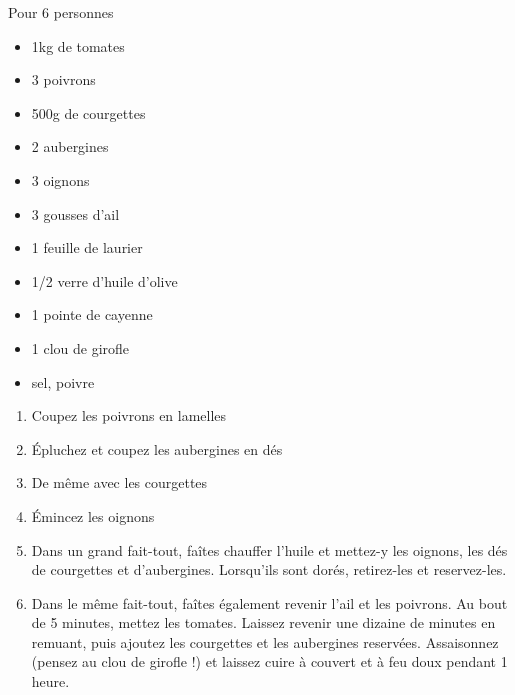 \bigskip
{}
{Pour 6 personnes}{\begin{itemize}
	\item 1kg de tomates
	\item 3 poivrons
	\item 500g de courgettes
	\item 2 aubergines
	\item 3 oignons
	\item 3 gousses d'ail
	\item 1 feuille de laurier
	\item 1/2 verre d'huile d'olive
	\item 1 pointe de cayenne
	\item 1 clou de girofle
	\item sel, poivre
\end{itemize}}
{\phantom{.}

\bigskip
\begin{enumerate}
	\item Coupez les poivrons en lamelles
	\item Épluchez et coupez les aubergines en dés
	\item De même avec les courgettes
	\item Émincez les oignons
	\item Dans un grand fait-tout, faîtes chauffer l'huile et mettez-y les oignons, les dés de courgettes et d'aubergines. Lorsqu'ils sont dorés, retirez-les et reservez-les.
	\item Dans le même fait-tout, faîtes également revenir l'ail et les poivrons. Au bout de 5 minutes, mettez les tomates. Laissez revenir une dizaine de minutes en remuant, puis ajoutez les courgettes et les aubergines reservées. Assaisonnez (pensez au clou de girofle !) et laissez cuire à couvert et à feu doux pendant 1 heure.
\end{enumerate}}

